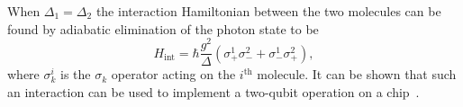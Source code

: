 When $\Delta_1 = \Delta_2$ the interaction Hamiltonian between the two
molecules can be found by adiabatic elimination of the photon state to
be~\cite{Andre2006}
%
\begin{equation}
  H_\text{int} = \hbar \frac{g^2}{\Delta} (\sigma_+^1\sigma_-^2 +
  \sigma_-^1\sigma_+^2),
\end{equation}
%
where $\sigma^i_k$ is the $\sigma_k$ operator acting on the
$i^\text{th}$ molecule. It can be shown that such an interaction can be used to
implement a two-qubit operation on a chip~\cite{Andre2006,
PhysRevA.69.062320}.

